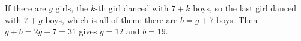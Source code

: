 If there are $g$ girls, the $k$-th girl danced with $7+k$ boys, so the last girl danced with $7+g$ boys, which is all of them: there are $b=g+7$ boys. Then $g+b=2g+7=31$ gives $g=12$ and $b=\boxed{19}$.
